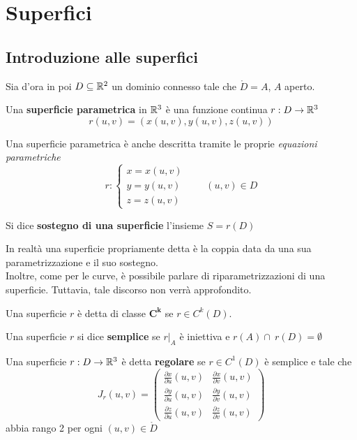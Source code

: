 \chapter{Superfici}
\section{Introduzione alle superfici}
Sia d'ora in poi $D \subseteq \mathbb{R}^2$ un dominio connesso tale che $\mathring{D}=A$, $A$ aperto.
\begin{definition} \label{Def: Superficie parametrica}
    Una \textbf{superficie parametrica} in $\mathbb{R}^3$ è una funzione continua $r: D \to \mathbb{R}^3$ 
    \begin{equation*}
        r(u,v)=(x(u,v), y(u,v), z(u,v))
    \end{equation*}
\end{definition}
Una superficie parametrica è anche descritta tramite le proprie \textit{equazioni parametriche}
\begin{equation*}
    r: \begin{cases}
        x=x(u,v)\\
        y=y(u,v)\\
        z=z(u,v)
    \end{cases}
    \qquad (u,v) \in D
\end{equation*}
\begin{definition} \label{Def: Sostegno di una superficie}
    Si dice \textbf{sostegno di una superficie} l'insieme $S=r(D)$
\end{definition}
In realtà una superficie propriamente detta è la coppia data da una sua parametrizzazione e il suo sostegno.\\
Inoltre, come per le curve, è possibile parlare di riparametrizzazioni di una superficie. Tuttavia, tale discorso non verrà approfondito.
\begin{definition} \label{Def: Superficie di classe C^k}
    Una superficie $r$ è detta di classe $\mathbf{C^k}$ se $r \in C^k(D)$.
\end{definition}
\begin{definition} \label{Def: Superficie semplice}
    Una superficie $r$ si dice \textbf{semplice} se $r|_A$ è iniettiva e $r(A) \cap\ r(D)= \emptyset$
\end{definition}
\begin{definition} \label{Def: Superficie regolare}
    Una superficie $r: D \to \mathbb{R}^3$ è detta \textbf{regolare} se $r \in C^1(D)$ è semplice e tale che
    \begin{equation*}
        J_r(u,v)= \begin{pmatrix}
            \frac{\partial x}{\partial u}(u,v) & \frac{\partial x}{\partial v}(u,v)\\
            \frac{\partial y}{\partial u}(u,v) & \frac{\partial y}{\partial v}(u,v)\\
            \frac{\partial z}{\partial u}(u,v) & \frac{\partial z}{\partial v}(u,v)
        \end{pmatrix}
    \end{equation*}
abbia rango 2 per ogni $(u,v) \in \mathring{D}$
\end{definition}

